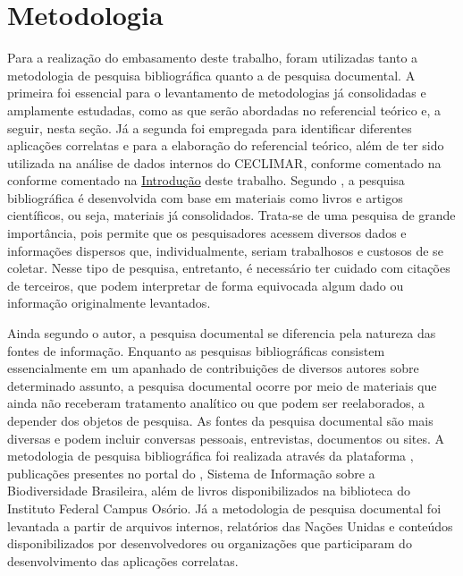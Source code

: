 \chapter{Metodologia}\label{metodologia}

Para a realização do embasamento deste trabalho, foram utilizadas tanto a metodologia de pesquisa bibliográfica 
quanto a de pesquisa documental. A primeira foi essencial para o levantamento de metodologias já consolidadas e 
amplamente estudadas, como as que serão abordadas no referencial teórico e, a seguir, nesta seção. Já a segunda 
foi empregada para identificar diferentes aplicações correlatas e para a elaboração do referencial teórico, além 
de ter sido utilizada na análise de dados internos do CECLIMAR, conforme comentado na conforme comentado na 
\hyperref[chapter:intro]{Introdução} deste trabalho.
Segundo , a pesquisa bibliográfica é desenvolvida com base em materiais como livros 
e artigos científicos, ou seja, materiais já consolidados. Trata-se de uma pesquisa de grande importância, pois 
permite que os pesquisadores acessem diversos dados e informações dispersos que, individualmente, seriam 
trabalhosos e custosos de se coletar. Nesse tipo de pesquisa, entretanto, é necessário ter cuidado com citações 
de terceiros, que podem interpretar de forma equivocada algum dado ou informação originalmente levantados.

Ainda segundo o autor, a pesquisa documental se diferencia pela natureza das fontes de informação. Enquanto as 
pesquisas bibliográficas consistem essencialmente em um apanhado de contribuições de diversos autores sobre 
determinado assunto, a pesquisa documental ocorre por meio de materiais que ainda não receberam tratamento 
analítico ou que podem ser reelaborados, a depender dos objetos de pesquisa. As fontes da pesquisa documental 
são mais diversas e podem incluir conversas pessoais, entrevistas, documentos ou sites.
A metodologia de pesquisa bibliográfica foi realizada através da plataforma , publicações 
presentes no portal do , Sistema de Informação 
sobre a Biodiversidade Brasileira, além de livros disponibilizados na biblioteca 
do Instituto Federal Campus Osório. Já a metodologia de pesquisa documental 
foi levantada a partir de arquivos internos, relatórios das Nações Unidas e conteúdos disponibilizados por 
desenvolvedores ou organizações que participaram do desenvolvimento das aplicações correlatas.

